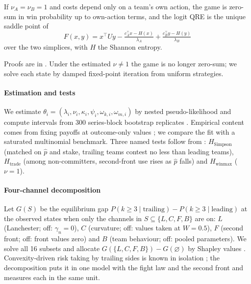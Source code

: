 \begin{proposition}[Uniqueness]\label{prop:unique}
If $\nu_A=\nu_B=1$ and costs depend only on a team's own action, the game is zero-sum in win probability up to own-action terms, and the logit QRE is the unique saddle point of
\[
F(x,y)=x^\top Uy-\tfrac{c_A^\top x-H(x)}{\lambda_A}+\tfrac{c_B^\top y-H(y)}{\lambda_B}
\]
over the two simplices, with $H$ the Shannon entropy.
\end{proposition}
Proofs are in .
Under the estimated $\nu\neq1$ the game is no longer zero-sum; we solve each state by damped fixed-point iteration from uniform strategies.

\paragraph*{Estimation and tests}
We estimate $\theta_i=(\lambda_i,\nu_i,\kappa_i,\psi_i,\omega_{k,i},\omega_{m,i})$ by nested pseudo-likelihood \citep{aguirregabiria2007sequential} and compute intervals from 300 series-block bootstrap replicates \citep{kunsch1989jackknife}.
Empirical content comes from fixing payoffs at outcome-only values \citep{haile2008empirical}; we compare the fit with a saturated multinomial benchmark.
Three named tests follow from : $H_{\mathrm{Simpson}}$ (matched on $\hat p$ and stake, trailing teams contest no less than leading teams), $H_{\mathrm{trade}}$ (among non-committers, second-front use rises as $\hat p$ falls) and $H_{\mathrm{winmax}}$ ($\nu=1$).

\paragraph*{Four-channel decomposition}
Let $G(S)$ be the equilibrium gap $P(k\geq3\mid\text{trailing})-P(k\geq3\mid\text{leading})$ at the observed states when only the channels in $S\subseteq\{L,C,F,B\}$ are on: $L$ (Lanchester; off: $\gamma_n=0$), $C$ (curvature; off: values taken at $W=0.5$), $F$ (second front; off: front values zero) and $B$ (team behaviour; off: pooled parameters).
We solve all 16 subsets and allocate $G(\{L,C,F,B\})-G(\varnothing)$ by Shapley values \citep{shapley1953value}.
Convexity-driven risk taking by trailing sides is known in isolation \citep{cabral2003rd,skinner2011scoring}; the decomposition puts it in one model with the fight law and the second front and measures each in the same unit.
